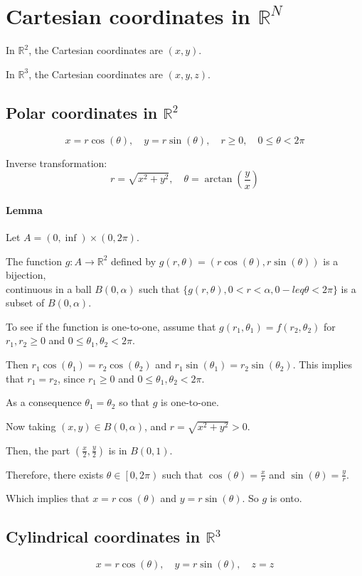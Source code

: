 \documentclass[11pt]{article}
\begin{document}
\section{Cartesian coordinates in $\mathbb{R}^N$}
In $\mathbb{R}^2$, the Cartesian coordinates are $(x,y)$.

In $\mathbb{R}^3$, the Cartesian coordinates are $(x,y,z)$.

\subsection{Polar coordinates in $\mathbb{R}^2$}
\[
x = r \cos(\theta), \quad y = r \sin(\theta), \quad r \geq 0, \quad 0 \leq \theta < 2\pi
\]

Inverse transformation:
\[
r = \sqrt{x^2 + y^2}, \quad \theta = \arctan\left(\frac{y}{x}\right)
\]

\paragraph{Lemma}
Let $A = (0, \inf) \times (0, 2\pi)$. 

The function $g : A \rightarrow \mathbb{R}^2$ defined by $g(r, \theta) = (r \cos(\theta), r \sin(\theta))$ is a bijection, \\
continuous in a ball $B(0, \alpha)$ such that $\{g(r, \theta), 0 < r < \alpha, 0 -leq \theta < 2\pi\}$ is a subset of $B(0, \alpha)$.

To see if the function is one-to-one, assume that $g(r_1, \theta_1) = f(r_2, \theta_2)$ for $r_1, r_2 \geq 0$ and $0 \leq \theta_1, \theta_2 < 2\pi$.

Then $r_1 \cos(\theta_1) = r_2 \cos(\theta_2)$ and $r_1 \sin(\theta_1) = r_2 \sin(\theta_2)$. This implies that $r_1 = r_2$, since $r_1 \geq 0$ and $0 \leq \theta_1, \theta_2 < 2\pi$.

As a consequence $\theta_1 = \theta_2$ so that $g$ is one-to-one.

Now taking $(x,y) \in B(0, \alpha)$, and $r = \sqrt{x^2 + y^2} > 0$.

Then, the part $(\frac{x}{2}, \frac{y}{2})$ is in $B(0, 1)$.

Therefore, there exists $\theta \in \left[0, 2\pi\right)$ such that $\cos(\theta) = \frac{x}{r}$ and $\sin(\theta) = \frac{y}{r}$.

Which implies that $x = r \cos(\theta)$ and $y = r \sin(\theta)$. So $g$ is onto.

\subsection{Cylindrical coordinates in $\mathbb{R}^3$}
\[
x = r \cos(\theta), \quad y = r \sin(\theta), \quad z = z
\]
\end{document}
